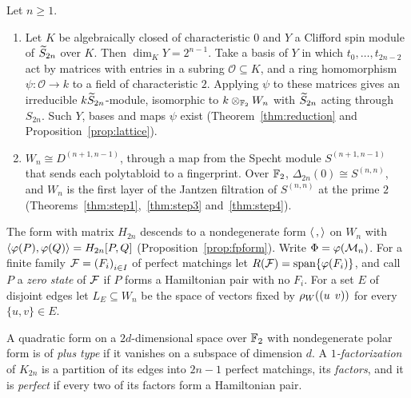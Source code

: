 \begin{mainthm}\label{mthm:C}
Let $n\ge1$.
\begin{enumerate}
\item Let $K$ be algebraically closed of characteristic $0$ and $Y$ a Clifford spin module of $\widetilde{S}_{2n}$ over $K$. Then $\dim_{K}Y=2^{n-1}$. Take a basis of $Y$ in which $t_0,\dots,t_{2n-2}$ act by matrices with entries in a subring $\mathcal O\subseteq K$, and a ring homomorphism $\psi\colon\mathcal O\to k$ to a field of characteristic $2$. Applying $\psi$ to these matrices gives an irreducible $k\widetilde{S}_{2n}$-module, isomorphic to $k\otimes_{\mathbb{F}_2}W_n$ with $\widetilde{S}_{2n}$ acting through $S_{2n}$. Such $Y$, bases and maps $\psi$ exist \textup{(Theorem~\ref{thm:reduction} and Proposition~\ref{prop:lattice})}.
\item $W_n\cong D^{(n+1,n-1)}$, through a map from the Specht module $S^{(n+1,n-1)}$ that sends each polytabloid to a fingerprint. Over $\mathbb{F}_2$, $\Delta_{2n}(0)\cong S^{(n,n)}$, and $W_n$ is the first layer of the Jantzen filtration of $S^{(n,n)}$ at the prime $2$ \textup{(Theorems~\ref{thm:step1},~\ref{thm:step3} and~\ref{thm:step4})}.
\end{enumerate}
\end{mainthm}

The form with matrix $H_{2n}$ descends to a nondegenerate form $\langle\,,\rangle$ on $W_n$ with $\langle\varphi(P),\varphi(Q)\rangle=H_{2n}[P,Q]$ (Proposition~\ref{prop:fpform}). Write $\Phi=\varphi(\mathcal{M}_n)$. For a finite family $\mathcal{F}={(F_i)}_{i\in I}$ of perfect matchings let $R(\mathcal{F})=\operatorname{span}\{\varphi(F_i)\}$, and call $P$ a \emph{zero state} of $\mathcal{F}$ if $P$ forms a Hamiltonian pair with no $F_i$. For a set $E$ of disjoint edges let $L_E\subseteq W_n$ be the space of vectors fixed by $\rho_W((u\;\,v))$ for every $\{u,v\}\in E$.

A quadratic form on a $2d$-dimensional space over $\mathbb{F}_2$ with nondegenerate polar form is of \emph{plus type} if it vanishes on a subspace of dimension $d$. A \emph{$1$-factorization} of $K_{2n}$ is a partition of its edges into $2n-1$ perfect matchings, its \emph{factors}, and it is \emph{perfect} if every two of its factors form a Hamiltonian pair.

